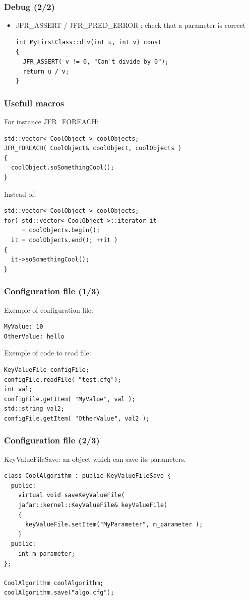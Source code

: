 \documentclass[compress]{beamer}
\begin{document}
\begin{frame}[fragile]
  \frametitle{Debug (2/2)}
  \begin{itemize}
   \item JFR\_ASSERT / JFR\_PRED\_ERROR : check that a parameter is correct
      \begin{lstlisting}
int MyFirstClass::div(int u, int v) const
{
  JFR_ASSERT( v != 0, "Can't divide by 0");
  return u / v;
}
      \end{lstlisting}
  \end{itemize}
\end{frame}


\begin{frame}[fragile]
  \frametitle{Usefull macros}
  For instance JFR\_FOREACH:
  \begin{lstlisting}
std::vector< CoolObject > coolObjects;
JFR_FOREACH( CoolObject& coolObject, coolObjects )
{
  coolObject.soSomethingCool();
}
  \end{lstlisting}
  Instead of:
  \begin{lstlisting}
std::vector< CoolObject > coolObjects;
for( std::vector< CoolObject >::iterator it
     = coolObjects.begin();
  it = coolObjects.end(); ++it )
{
  it->soSomethingCool();
}
  \end{lstlisting}
\end{frame}


\begin{frame}[fragile]
  \frametitle{Configuration file (1/3)}
Exemple of configuration file:
\begin{lstlisting}
MyValue: 10
OtherValue: hello
\end{lstlisting}
  
Exemple of code to read file:
\begin{lstlisting}
KeyValueFile configFile;
configFile.readFile( "test.cfg");
int val;
configFile.getItem( "MyValue", val );
std::string val2;
configFile.getItem( "OtherValue", val2 );
\end{lstlisting}


\end{frame}


\begin{frame}[fragile]
  \frametitle{Configuration file (2/3)}
KeyValueFileSave: an object which can save its parameters.
 
\begin{lstlisting}
class CoolAlgorithm : public KeyValueFileSave {
  public:
    virtual void saveKeyValueFile(
    jafar::kernel::KeyValueFile& keyValueFile)
    {
      keyValueFile.setItem("MyParameter", m_parameter );
    }
  public:
    int m_parameter;
};

CoolAlgorithm coolAlgorithm;
coolAlgorithm.save("algo.cfg");

\end{lstlisting}
 
\end{frame}
\end{document}
